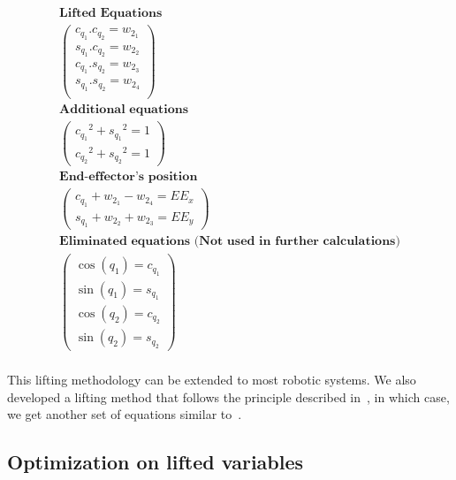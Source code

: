 \begin{equation}
\begin{array}{c}
  \textbf{Lifted Equations}\\
  \left(\begin{array}{cc}
    c_{q_1}.c_{q_2} = w_{2_1}\\
    s_{q_1}.c_{q_2} = w_{2_2}\\
    c_{q_1}.s_{q_2} = w_{2_3}\\
    s_{q_1}.s_{q_2} = w_{2_4}\\
  \end{array}\right)\\
  \textbf{Additional equations}\\
  \left(\begin{array}{c}
    {c_{q_1}}^2 + {s_{q_1}}^2 = 1\\
    {c_{q_2}}^2 + {s_{q_2}}^2 = 1
  \end{array}\right)\\
  \textbf{End-effector's position}\\
  \left(\begin{array}{c}
    c_{q_1} + w_{2_1} - w_{2_4} = EE_x\\
    s_{q_1} + w_{2_2} + w_{2_3} = EE_y
  \end{array}\right)\\
  \textbf{Eliminated equations (Not used in further calculations)}\\
  \left(\begin{array}{c}
    \cos(q_1)  =  c_{q_1} \\
    \sin(q_1)  =  s_{q_1} \\
    \cos(q_2)  =  c_{q_2} \\
    \sin(q_2)  =  s_{q_2}
  \end{array}\right)\\
\end{array}
\label{eq:lifted_equations_trigo}
\end{equation}

This lifting methodology can be extended to most robotic systems.
We also developed a lifting method that follows the principle described in~, in which case, we get another set of equations similar to~.

\subsection{Optimization on lifted variables}
\label{subsec:optimization_on_lifted_variables}


